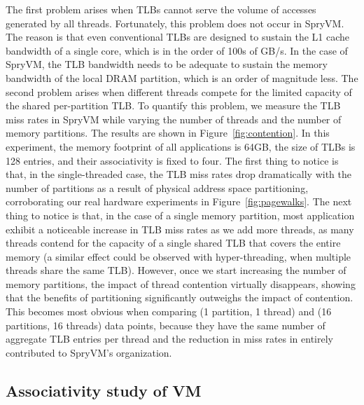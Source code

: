 The first problem arises when TLBs cannot serve the volume of accesses generated by all threads. Fortunately, this problem does not occur in SpryVM. The reason is that even conventional TLBs are designed to sustain the L1 cache bandwidth of a single core, which is in the order of 100s of GB/s. In the case of SpryVM, the TLB bandwidth needs to be adequate to sustain the memory bandwidth of the local DRAM partition, which is an order of magnitude less. The second problem arises when different threads compete for the limited capacity of the shared per-partition TLB. To quantify this problem, we measure the TLB miss rates in SpryVM while varying the number of threads and the number of memory partitions. The results are shown in Figure~\ref{fig:contention}. In this experiment, the memory footprint of all applications is 64GB, the size of TLBs is 128 entries, and their associativity is fixed to four. The first thing to notice is that, in the single-threaded case, the TLB miss rates drop dramatically with the number of partitions as a result of physical address space partitioning, corroborating our real hardware experiments in Figure~\ref{fig:pagewalks}. The next thing to notice is that, in the case of a single memory partition, most application exhibit a noticeable increase in TLB miss rates as we add more threads, as many threads contend for the capacity of a single shared TLB that covers the entire memory (a similar effect could be observed with hyper-threading, when multiple threads share the same TLB). However, once we start increasing the number of memory partitions, the impact of thread contention virtually disappears, showing that the benefits of partitioning significantly outweighs the impact of contention. This becomes most obvious when comparing (1 partition, 1 thread) and (16 partitions, 16 threads) data  points, because they have the same number of aggregate TLB entries per thread and the reduction in miss rates in entirely contributed to SpryVM's organization. 

\subsection{Associativity study of VM}


